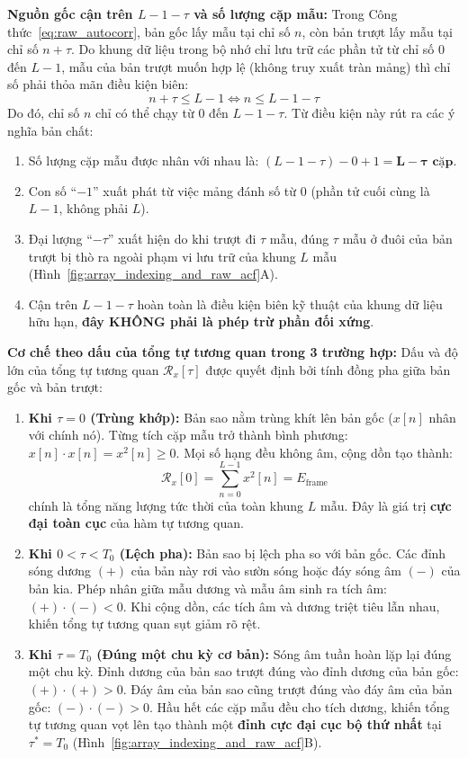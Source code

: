 \documentclass[11pt,a4paper]{article}
\begin{document}
\textbf{Nguồn gốc cận trên $L - 1 - \tau$ và số lượng cặp mẫu:}
Trong Công thức~\eqref{eq:raw_autocorr}, bản gốc lấy mẫu tại chỉ số $n$, còn bản trượt lấy mẫu tại chỉ số $n + \tau$. Do khung dữ liệu trong bộ nhớ chỉ lưu trữ các phần tử từ chỉ số $0$ đến $L - 1$, mẫu của bản trượt muốn hợp lệ (không truy xuất tràn mảng) thì chỉ số phải thỏa mãn điều kiện biên:
\begin{equation}
n + \tau \le L - 1 \iff n \le L - 1 - \tau
\end{equation}
Do đó, chỉ số $n$ chỉ có thể chạy từ $0$ đến $L - 1 - \tau$. Từ điều kiện này rút ra các ý nghĩa bản chất:
\begin{enumerate}
    \setlength{\itemsep}{0.5pt}
    \item Số lượng cặp mẫu được nhân với nhau là: $(L - 1 - \tau) - 0 + 1 = \mathbf{L - \tau\text{ cặp}}$.
    \item Con số ``$-1$'' xuất phát từ việc mảng đánh số từ $0$ (phần tử cuối cùng là $L - 1$, không phải $L$).
    \item Đại lượng ``$-\tau$'' xuất hiện do khi trượt đi $\tau$ mẫu, đúng $\tau$ mẫu ở đuôi của bản trượt bị thò ra ngoài phạm vi lưu trữ của khung $L$ mẫu (Hình~\ref{fig:array_indexing_and_raw_acf}A).
    \item Cận trên $L - 1 - \tau$ hoàn toàn là điều kiện biên kỹ thuật của khung dữ liệu hữu hạn, \textbf{đây KHÔNG phải là phép trừ phần đối xứng}.
\end{enumerate}

\textbf{Cơ chế theo dấu của tổng tự tương quan trong 3 trường hợp:}
Dấu và độ lớn của tổng tự tương quan $\mathcal{R}_x[\tau]$ được quyết định bởi tính đồng pha giữa bản gốc và bản trượt:
\begin{enumerate}
    \setlength{\itemsep}{0.5pt}
    \item \textbf{Khi $\tau = 0$ (Trùng khớp):} Bản sao nằm trùng khít lên bản gốc ($x[n]$ nhân với chính nó). Từng tích cặp mẫu trở thành bình phương: $x[n] \cdot x[n] = x^2[n] \ge 0$. Mọi số hạng đều không âm, cộng dồn tạo thành:
    \[
    \mathcal{R}_x[0] = \sum_{n=0}^{L - 1} x^2[n] = E_{\text{frame}}
    \]
    chính là tổng năng lượng tức thời của toàn khung $L$ mẫu. Đây là giá trị \textbf{cực đại toàn cục} của hàm tự tương quan.
    \item \textbf{Khi $0 < \tau < T_0$ (Lệch pha):} Bản sao bị lệch pha so với bản gốc. Các đỉnh sóng dương $(+)$ của bản này rơi vào sườn sóng hoặc đáy sóng âm $(-)$ của bản kia. Phép nhân giữa mẫu dương và mẫu âm sinh ra tích âm: $(+) \cdot (-) < 0$. Khi cộng dồn, các tích âm và dương triệt tiêu lẫn nhau, khiến tổng tự tương quan sụt giảm rõ rệt.
    \item \textbf{Khi $\tau = T_0$ (Đúng một chu kỳ cơ bản):} Sóng âm tuần hoàn lặp lại đúng một chu kỳ. Đỉnh dương của bản sao trượt đúng vào đỉnh dương của bản gốc: $(+) \cdot (+) > 0$. Đáy âm của bản sao cũng trượt đúng vào đáy âm của bản gốc: $(-) \cdot (-) > 0$. Hầu hết các cặp mẫu đều cho tích dương, khiến tổng tự tương quan vọt lên tạo thành một \textbf{đỉnh cực đại cục bộ thứ nhất} tại $\tau^* = T_0$ (Hình~\ref{fig:array_indexing_and_raw_acf}B).
\end{enumerate}
\end{document}
